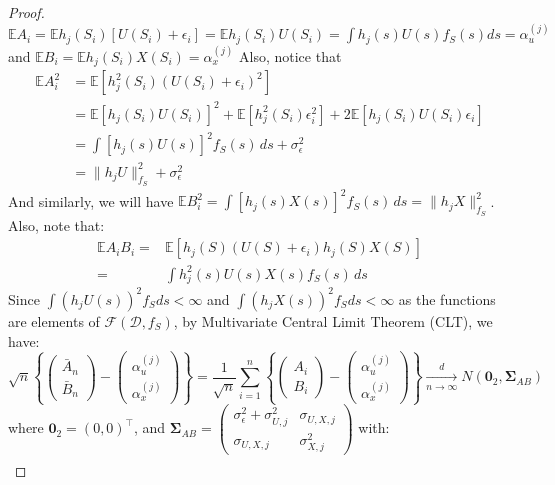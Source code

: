 \documentclass[
  12pt]{article}
\newcommand{\dnlim}{\xrightarrow[n \to \infty]{d}}
\newcommand{\calD}{\mathcal{D}}
\newcommand{\calF}{\mathcal{F}}
\newcommand{\bSig}{\boldsymbol{\Sigma}}
\newcommand{\E}{\mathbb{E}}
\newcommand{\bzero}{\boldsymbol{0}}
\begin{document}
\begin{proof}
        $\E A_i =\E h_j(S_i)[U(S_i)+\epsilon_i] = \E h_j(S_i)U(S_i) = \int h_j(s)U(s)f_S(s)ds = \alpha_u^{(j)}$ and $\E B_i =\E h_j(S_i)X(S_i) = \alpha_x^{(j)}$
Also, notice that 
$$
\begin{aligned}
    \E A_i^2 & = \E \left[h_j^2(S_i)(U(S_i) + \epsilon_i)^2\right]\\
    & = \E [h_j(S_i)U(S_i)]^2 + \E \left[h^2_j(S_i)\epsilon_i^2\right] + 2\E [h_j(S_i)U(S_i)\epsilon_i]\\
    & = \int [h_j(s)U(s)]^2f_S(s)\,ds +  \sigma^2_\epsilon\\
    & = \|h_jU\|^2_{f_S} + \sigma^2_\epsilon
\end{aligned}
$$   
And similarly, we will have $\E B_i^2 = \int [h_j(s)X(s)]^2f_S(s)\,ds = \|h_jX\|^2_{f_S}$. Also, note that:
$$
\begin{aligned}
    \E A_i B_i = & \E [h_j(S)(U(S) + \epsilon_i)h_j(S)X(S) ]\\
    = & \int h_j^2(s)U(s)X(s)f_S(s)\,ds 
\end{aligned}
$$
Since $\int(h_j U(s))^2f_Sds< \infty$ and $\int(h_j X(s))^2f_Sds < \infty $ as the functions are elements of $\calF(\calD,f_S)$, by Multivariate Central Limit Theorem (CLT), we have:
    \begin{equation}\label{eq:mult-clt}
    \sqrt{n}\left\{\begin{pmatrix}
        \bar{A}_n\\\bar{B}_n
    \end{pmatrix} -  \begin{pmatrix}
        \alpha_u^{(j)}\\\alpha_x^{(j)}
    \end{pmatrix}\right\} = 
     \dfrac{1}{\sqrt{n}}\sum_{i=1}^n\left\{\begin{pmatrix}
        A_i\\B_i
    \end{pmatrix} -  \begin{pmatrix}
        \alpha_u^{(j)}\\\alpha_x^{(j)}
    \end{pmatrix}\right\} \dnlim N\left(\bzero_2,\bSig_{AB}\right)
    \end{equation}
where $\bzero_2 = (0,0)^\top$, and $\bSig_{AB} = \begin{pmatrix}
    \sigma^2_\epsilon + \sigma^2_{U,j} & \sigma_{U,X,j}\\
    \sigma_{U,X,j} & \sigma^2_{X,j} 
\end{pmatrix}$ with:
    $$
\begin{aligned}

\end{aligned}$$
\end{proof}
\end{document}
